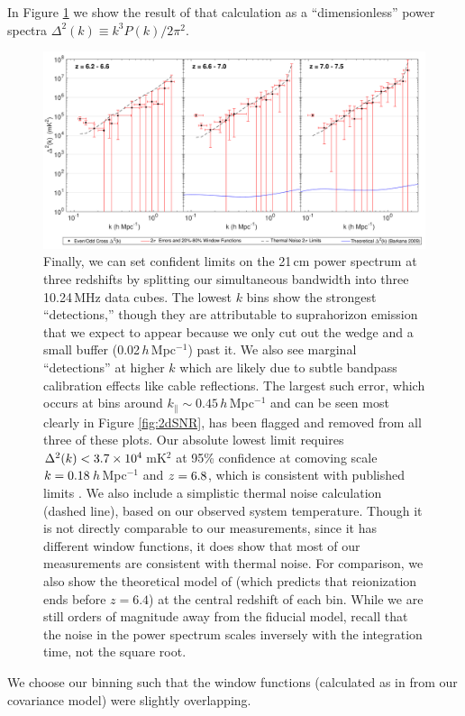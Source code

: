 In Figure \ref{fig:1dDeltaSq} we show the result of that calculation as a ``dimensionless'' power spectra $\Delta^2(k) \equiv k^3 P(k) /2\pi^2$.
\begin{figure}[] 
	\centering 
	\includegraphics[width=1\textwidth]{chap4_empirical_covariance/1dDeltaSqMultiRedshift.pdf}
	\caption[Limits on the 21\,cm power spectrum at three redshifts.]{Finally, we can set confident limits on the 21\,cm power spectrum at three redshifts by splitting our simultaneous bandwidth into three 10.24\,MHz data cubes. The lowest $k$ bins show the strongest ``detections,'' though they are attributable to suprahorizon emission \cite{pober13} that we expect to appear because we only cut out the wedge and a small buffer (0.02\,$h$\,Mpc$^{-1}$) past it. We also see marginal ``detections'' at higher $k$ which are likely due to subtle bandpass calibration effects like cable reflections. The largest such error, which occurs at bins around $k_\| \sim 0.45$\,$h$\,Mpc$^{-1}$ and can be seen most clearly in Figure \ref{fig:2dSNR}, has been flagged and removed from all three of these plots. Our absolute lowest limit requires $\Delta^2(k) < 3.7\times 10^4$\,mK$^2$ at 95\% confidence at comoving scale $k = 0.18$\,$h$\,Mpc$^{-1}$ and $z = 6.8$, which is consistent with published limits \cite{gmrtsignalloss,X13,parsons14,DannyMultiRedshift,ali15}. We also include a simplistic thermal noise calculation (dashed line), based on our observed system temperature. Though it is not directly comparable to our measurements, since it has different window functions, it does show that most of our measurements are consistent with thermal noise. For comparison, we also show the theoretical model of \cite{BarkanaPS2009} (which predicts that reionization ends before $z=6.4$) at the central redshift of each bin. While we are still orders of magnitude away from the fiducial model, recall that the noise in the power spectrum scales inversely with the integration time, not the square root.}
	\label{fig:1dDeltaSq}
\end{figure}
We choose our binning such that the window functions (calculated as in \cite{X13} from our covariance model) were slightly overlapping. 

